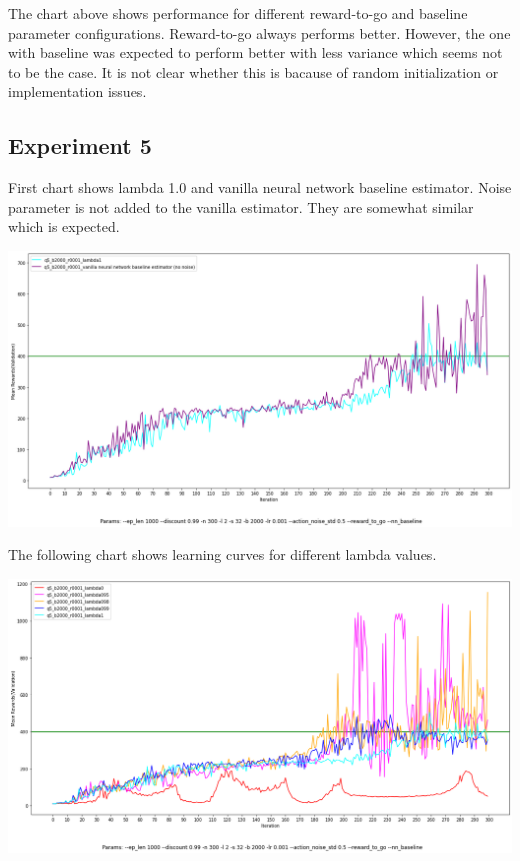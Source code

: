 \documentclass[11pt]{article}
\begin{document}
    The chart above shows performance for different reward-to-go and baseline parameter configurations.
    Reward-to-go always performs better.
    However, the one with baseline was expected to perform better with less variance which seems not to be the case.
    It is not clear whether this is bacause of random initialization or implementation issues.


    \subsection{Experiment 5}

    First chart shows lambda 1.0 and vanilla neural network baseline estimator.
    Noise parameter is not added to the vanilla estimator.
    They are somewhat similar which is expected.

    \hspace*{-0.75in}
    \includegraphics[scale=0.35]{q5/q5_lambda1_vs_vanilla}

    The following chart shows learning curves for different lambda values.

    \hspace*{-0.75in}
    \includegraphics[scale=0.35]{q5/q5_lambda_compare}
\end{document}
